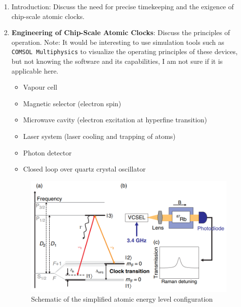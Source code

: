 \begin{enumerate}
    \item Introduction: Discuss the need for precise timekeeping and the exigence of chip-scale atomic clocks.
    \item \textbf{Engineering of Chip-Scale Atomic Clocks}: Discuss the principles of operation. Note: It would be interesting to use simulation tools such as \texttt{COMSOL Multiphysics} to visualize the operating principles of these devices, but not knowing the software and its capabilities, I am not sure if it is applicable here.
          \begin{itemize}
              \item Vapour cell
              \item Magnetic selector (electron spin)
              \item Microwave cavity (electron excitation at hyperfine transition)
              \item Laser system (laser cooling and trapping of atoms)
              \item Photon detector
              \item Closed loop over quartz crystal oscillator
          \end{itemize}
          \begin{figure}[H]
              \centering
              \includegraphics[width=.6\textwidth]{img/atomic_clock_logic}
              \caption{Schematic of the simplified atomic energy level configuration \cite{KNAPPE2008571}}
          \end{figure}


\end{enumerate}
